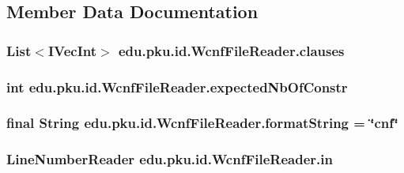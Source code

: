\subsection{Member Data Documentation}
\hypertarget{classedu_1_1pku_1_1id_1_1_wcnf_file_reader_aeaaed9fb9028bfc0ae5ff2bc1ef0bc79}{
\subsubsection[{clauses}]{\setlength{\rightskip}{0pt plus 5cm}List$<$IVecInt$>$ {\bf edu.pku.id.WcnfFileReader.clauses}}}
\label{classedu_1_1pku_1_1id_1_1_wcnf_file_reader_aeaaed9fb9028bfc0ae5ff2bc1ef0bc79}
\hypertarget{classedu_1_1pku_1_1id_1_1_wcnf_file_reader_ac763d0289c26b167a37a0ee4a069ddd1}{
\subsubsection[{expectedNbOfConstr}]{\setlength{\rightskip}{0pt plus 5cm}int {\bf edu.pku.id.WcnfFileReader.expectedNbOfConstr}}}
\label{classedu_1_1pku_1_1id_1_1_wcnf_file_reader_ac763d0289c26b167a37a0ee4a069ddd1}
\hypertarget{classedu_1_1pku_1_1id_1_1_wcnf_file_reader_a7663ee8090173a9af8dd25e5a5450f38}{
\subsubsection[{formatString}]{\setlength{\rightskip}{0pt plus 5cm}final String {\bf edu.pku.id.WcnfFileReader.formatString} = \char`\"{}cnf\char`\"{}}}
\label{classedu_1_1pku_1_1id_1_1_wcnf_file_reader_a7663ee8090173a9af8dd25e5a5450f38}
\hypertarget{classedu_1_1pku_1_1id_1_1_wcnf_file_reader_a3182838f96a068bdbd4df989489d99ef}{
\subsubsection[{in}]{\setlength{\rightskip}{0pt plus 5cm}LineNumberReader {\bf edu.pku.id.WcnfFileReader.in}}}
